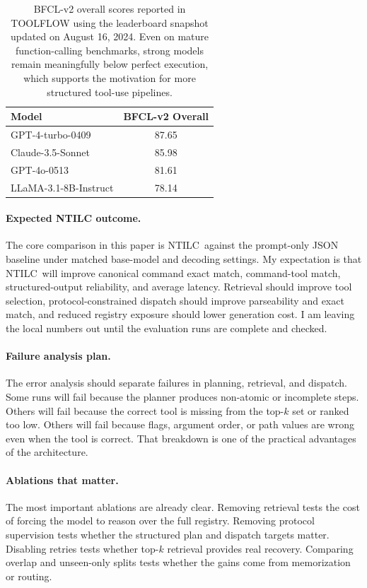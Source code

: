 \documentclass[10pt,twocolumn,letterpaper]{article}
\newcommand{\method}{NTILC}
\begin{document}
\begin{table}[t]
\centering
\small
\setlength{\tabcolsep}{5pt}
\begin{tabular}{lc}
\toprule
Model & BFCL-v2 Overall \\
\midrule
GPT-4-turbo-0409 & 87.65 \\
Claude-3.5-Sonnet & 85.98 \\
GPT-4o-0513 & 81.61 \\
LLaMA-3.1-8B-Instruct & 78.14 \\
\bottomrule
\end{tabular}
\caption{BFCL-v2 overall scores reported in TOOLFLOW using the leaderboard snapshot updated on August 16, 2024. Even on mature function-calling benchmarks, strong models remain meaningfully below perfect execution, which supports the motivation for more structured tool-use pipelines.}
\label{tab:bfcl}
\end{table}

\paragraph{Expected NTILC outcome.}
The core comparison in this paper is \method\ against the prompt-only JSON baseline under matched base-model and decoding settings. My expectation is that \method\ will improve canonical command exact match, command-tool match, structured-output reliability, and average latency. Retrieval should improve tool selection, protocol-constrained dispatch should improve parseability and exact match, and reduced registry exposure should lower generation cost. I am leaving the local numbers out until the evaluation runs are complete and checked.

\paragraph{Failure analysis plan.}
The error analysis should separate failures in planning, retrieval, and dispatch. Some runs will fail because the planner produces non-atomic or incomplete steps. Others will fail because the correct tool is missing from the top-$k$ set or ranked too low. Others will fail because flags, argument order, or path values are wrong even when the tool is correct. That breakdown is one of the practical advantages of the architecture.

\paragraph{Ablations that matter.}
The most important ablations are already clear. Removing retrieval tests the cost of forcing the model to reason over the full registry. Removing protocol supervision tests whether the structured plan and dispatch targets matter. Disabling retries tests whether top-$k$ retrieval provides real recovery. Comparing overlap and unseen-only splits tests whether the gains come from memorization or routing.
\end{document}
